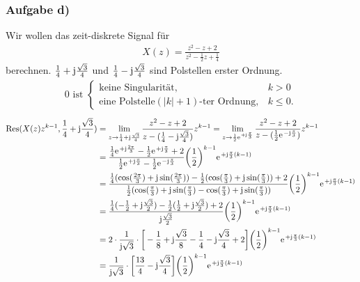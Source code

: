 \subsubsection{Aufgabe d)}
Wir wollen das zeit-diskrete Signal für
\begin{align}
	X(z)=\frac{z^2-z+2}{z^2-\frac{1}{2}z+\frac{1}{4}}
\end{align}
berechnen.
$\frac{1}{4}+\im\frac{\sqrt{3}}{4}$ und $\frac{1}{4}-\im\frac{\sqrt{3}}{4}$ sind Polstellen erster Ordnung.
\begin{align}
	0 \text{ ist }\begin{cases}
		\text{keine Singularität}, &k>0 \\
		\text{eine Polstelle} (|k|+1)\text{-ter Ordnung}, &k\leq 0.
	\end{cases}
\end{align}
\begin{align}
	\mathrm{Res}(X(z)z^{k-1},\frac{1}{4}+\im\frac{\sqrt{3}}{4})&=\lim\limits_{z\rightarrow\frac{1}{4}+\im\frac{\sqrt{3}}{4}}\frac{z^2-z+2}{z-(\frac{1}{4}-\im\frac{\sqrt{3}}{4})}z^{k-1}=\lim\limits_{z\rightarrow\frac{1}{2}\e^{+\im\frac{\pi}{3}}}\frac{z^2-z+2}{z-(\frac{1}{2}\e^{-\im\frac{\pi}{3}})}z^{k-1}\nonumber\\
	&=\frac{\frac{1}{4}\e^{+\im\frac{2\pi}{3}}-\frac{1}{2}\e^{+\im\frac{\pi}{3}}+2}{\frac{1}{2}\e^{+\im\frac{\pi}{3}}-\frac{1}{2}\e^{-\im\frac{\pi}{3}}}\bigg(\frac{1}{2}\bigg )^{k-1}\e^{+\im\frac{\pi}{3}(k-1)}\nonumber\\
	&=\frac{\frac{1}{4}(\cos(\frac{2\pi}{3})+\im\sin(\frac{2\pi}{3}))-\frac{1}{2}(\cos(\frac{\pi}{3})+\im\sin(\frac{\pi}{3}))+2}{\frac{1}{2}(\cos(\frac{\pi}{3})+\im\sin(\frac{\pi}{3})-\cos(\frac{\pi}{3})+\im\sin(\frac{\pi}{3}))}\bigg(\frac{1}{2}\bigg )^{k-1}\e^{+\im\frac{\pi}{3}(k-1)}\nonumber\\
	&=\frac{\frac{1}{4}(-\frac{1}{2}+\im\frac{\sqrt{3}}{2})-\frac{1}{2}(\frac{1}{2}+\im\frac{\sqrt{3}}{2})+2}{\im\frac{\sqrt{3}}{2}}\bigg(\frac{1}{2}\bigg )^{k-1}\e^{+\im\frac{\pi}{3}(k-1)}\nonumber\\
	&=2\cdot\frac{1}{\im\sqrt{3}}\cdot\bigg [-\frac{1}{8}+\im\frac{\sqrt{3}}{8}-\frac{1}{4}-\im\frac{\sqrt{3}}{4}+2\bigg]\bigg(\frac{1}{2}\bigg )^{k-1}\e^{+\im\frac{\pi}{3}(k-1)}\nonumber\\
	&=\frac{1}{\im\sqrt{3}}\cdot\bigg [\frac{13}{4}-\im\frac{\sqrt{3}}{4}\bigg]\bigg(\frac{1}{2}\bigg)^{k-1}\e^{+\im\frac{\pi}{3}(k-1)}
\end{align}
